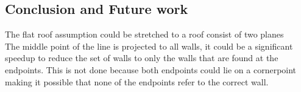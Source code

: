 \subsection{Conclusion and Future work}
The flat roof assumption could be stretched to a roof consist of two planes
\\
The middle point of the line is projected to all walls, it could be a significant speedup to reduce the set of walls to only the walls that are found at the endpoints. This is not done because both endpoints could lie on a cornerpoint making it possible that none of the endpoints refer to the correct wall.






